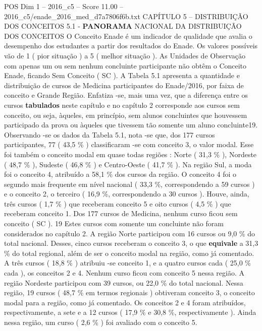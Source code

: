 \begin{textsample}{POS Dim 1 – 2016\_c5 – Score 11.00 – 2016\_c5/enade\_2016\_med\_d7a7806f6b.txt}  \label{ex:f1_pos_073}
CAPÍTULO 5 – DISTRIBUIÇÃO DOS CONCEITOS 5.1 - \textbf{PANORAMA} NACIONAL DA DISTRIBUIÇÃO DOS CONCEITOS O Conceito Enade é um indicador de qualidade que avalia o desempenho dos estudantes a partir dos resultados do Enade.
Os valores possíveis vão de 1 ( pior situação ) a 5 ( melhor situação ).
As Unidades de Observação com apenas um ou sem nenhum concluinte participante não obtêm o Conceito Enade, ficando Sem Conceito ( SC ).
A Tabela 5.1 apresenta a quantidade e distribuição de cursos de Medicina participantes do Enade/2016, por faixa de conceito e Grande Região.
Enfatiza -se, mais uma vez, que a diferença entre os cursos \textbf{tabulados} neste capítulo e no capítulo 2 corresponde aos cursos sem conceito, ou seja, àqueles, em princípio, sem alunos concluintes que houvessem participado da prova ou àqueles que tivessem tão somente um aluno concluinte19.
Observando -se os dados da Tabela 5.1, nota -se que, dos 177 cursos participantes, 77 ( 43,5 \% ) classificaram -se com conceito 3, o valor modal.
Esse foi também o conceito modal em quase todas regiões : Norte ( 31,3 \% ), Nordeste ( 48,7 \% ), Sudeste ( 46,8 \% ) e Centro-Oeste ( 41,7 \% ).
Na região Sul, a moda foi o conceito 4, atribuído a 58,1 \% dos cursos da região.
O conceito 4 foi o segundo mais frequente em nível nacional ( 33,3 \%, correspondendo a 59 cursos ) e o conceito 2, o terceiro ( 16,9 \%, correspondendo a 30 cursos ).
Houve, ainda, três cursos ( 1,7 \% ) que receberam conceito 5 e oito cursos ( 4,5 \% ) que receberam conceito 1.
Dos 177 cursos de Medicina, nenhum curso ficou sem conceito ( SC ). 19 Estes cursos com somente um concluinte não foram considerados no capítulo 2.
A região Norte participou com 16 cursos ou 9,0 \% do total nacional.
Desses, cinco cursos receberam o conceito 3, o que \textbf{equivale} a 31,3 \% do total regional, além de ser o conceito modal na região, como já comentado.
A três cursos ( 18,8 \% ) atribuiu -se conceito 1, e a quatro cursos cada ( 25,0 \% cada ), os conceitos 2 e 4.
Nenhum curso ficou com conceito 5 nessa região.
A região Nordeste participou com 39 cursos, ou 22,0 \% do total nacional.
Nessa região, 19 cursos ( 48,7 \% em termos regionais ) obtiveram conceito 3, o conceito modal para a região, como já comentado.
Os conceitos 2 e 4 foram atribuídos, respectivamente, a sete e a 12 cursos ( 17,9 \% e 30,8 \%, respectivamente ).
Ainda nessa região, um curso ( 2,6 \% ) foi avaliado com o conceito 5.

\end{textsample}

